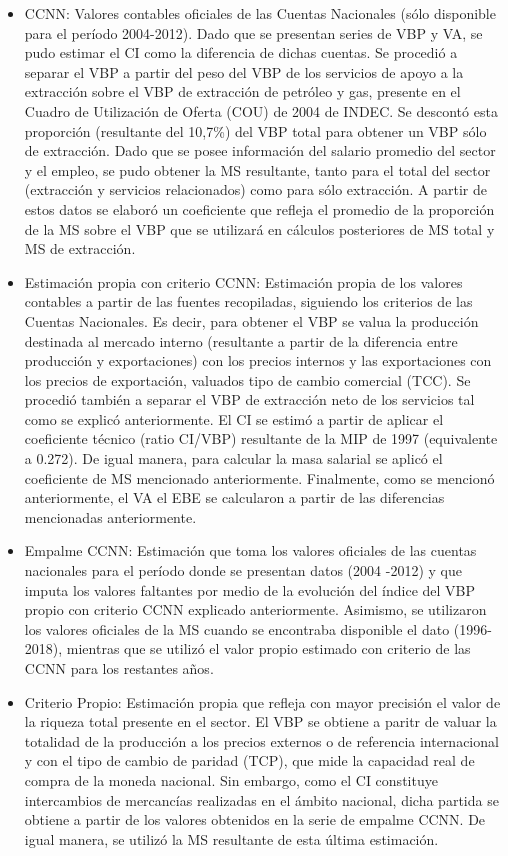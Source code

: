 \documentclass[letterpaper,11pt, spanish]{scrartcl}
\begin{document}
\begin{itemize}
    \item CCNN: Valores contables oficiales de las Cuentas Nacionales (sólo disponible para el período 2004-2012). Dado que se presentan series de VBP y VA, se pudo estimar el CI como la diferencia de dichas cuentas. Se procedió a separar el VBP a partir del peso del VBP de los servicios de apoyo a la extracción sobre el VBP de extracción de petróleo y gas, presente en el Cuadro de Utilización de Oferta (COU) de 2004 de INDEC. Se descontó esta proporción (resultante del 10,7\%) del VBP total para obtener un VBP sólo de extracción. Dado que se posee información del salario promedio del sector y el empleo, se pudo obtener la MS resultante, tanto para el total del sector (extracción y servicios relacionados) como para sólo extracción. A partir de estos datos se elaboró un coeficiente que refleja el promedio de la proporción de la MS sobre el VBP que se utilizará en cálculos posteriores de MS total y MS de extracción. 
    \item Estimación propia con criterio CCNN: Estimación propia de los valores contables a partir de las fuentes recopiladas, siguiendo los criterios de las Cuentas Nacionales. Es decir, para obtener el VBP se valua la producción destinada al mercado interno (resultante a partir de la diferencia entre producción y exportaciones) con los precios internos y las exportaciones con los precios de exportación, valuados tipo de cambio comercial (TCC). Se procedió también a separar el VBP de extracción neto de los servicios tal como se explicó anteriormente. El CI se estimó a partir de aplicar el coeficiente técnico (ratio CI/VBP) resultante de la MIP de 1997 (equivalente a 0.272). De igual manera, para calcular la masa salarial se aplicó el coeficiente de MS mencionado anteriormente. Finalmente, como se mencionó anteriormente, el VA el EBE se calcularon a partir de las diferencias mencionadas anteriormente.
    \item Empalme CCNN: Estimación que toma los valores oficiales de las cuentas nacionales para el período donde se presentan datos (2004 -2012) y que imputa los valores faltantes por medio de la evolución del índice del VBP propio con criterio CCNN explicado anteriormente. Asimismo, se utilizaron los valores oficiales de la MS cuando se encontraba disponible el dato (1996-2018), mientras que se utilizó el valor propio estimado con criterio de las CCNN para los restantes años. \item Criterio Propio: Estimación propia que refleja con mayor precisión el valor de la riqueza total presente en el sector. El VBP se obtiene a paritr de valuar la totalidad de la producción a los precios externos o de referencia internacional y con el tipo de cambio de paridad (TCP), que mide la capacidad real de compra de la moneda nacional. Sin embargo, como el CI constituye intercambios de mercancías realizadas en el ámbito nacional, dicha partida se obtiene a partir de los valores obtenidos en la serie de empalme CCNN. De igual manera, se utilizó la MS resultante de esta última estimación. 
    

\end{itemize}
\end{document}
